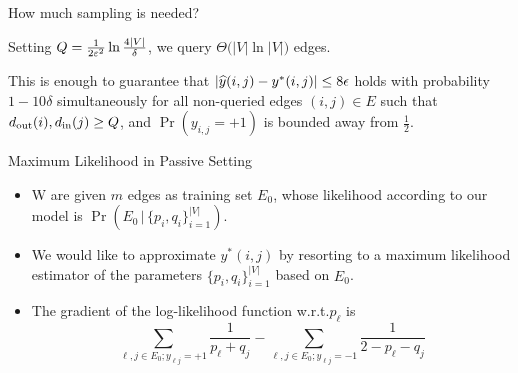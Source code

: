 \documentclass[10pt,svgnames,ignorenonframetext,final]{beamer}
\providecommand{\largelist}{%
  \setlength{\itemsep}{8pt}\setlength{\parskip}{3pt}}
\begin{document}
\begin{frame}{How much sampling is needed?}

Setting $Q = \tfrac{1}{2\varepsilon^2}\ln\frac{4|V|}{\delta}$, we query $\Theta\big(|V|\ln|V|\big)$ edges.

This is enough to guarantee that \alert{$\left|\widehat{y}(i,j) - y^*(i,j)\right|
\leq 8\epsilon $ holds with probability $1-10\delta$} simultaneously for all
non-queried edges $(i,j) \in E$ such that $d_{\mathrm{out}}(i),d_{\mathrm{in}}(j) \ge Q$, and
$\Pr(y_{i,j}=+1)$ is bounded away from $\tfrac{1}{2}$.

\end{frame}

\begin{frame}{Maximum Likelihood in Passive Setting}

  \begin{itemize}[<+->]
    \largelist
  \item
    W are given $m$ edges as training set \(E_0\), whose likelihood according to our model is
    $\Pr\left(E_0\,|\, \{p_i, q_i\}_{i=1}^{|V|}\right)$.

  \item
    We would like to \alert{approximate \(y^*(i,j)\)} by resorting to a maximum
    likelihood estimator of the parameters \(\{p_i, q_i\}_{i=1}^{|V|}\)
    based on \(E_0\).

  \item 
    The gradient of the log-likelihood function w.r.t.\@ $p_\ell$ is
    \begin{equation*}
      \sum_{\ell,j\in E_0; y_{\ell j}=+1} \frac{1}{p_\ell+q_j} -
      \sum_{\ell,j\in E_0; y_{\ell j}=-1} \frac{1}{2-p_\ell-q_j}
    \end{equation*}
\end{itemize}

\end{frame}
\end{document}
